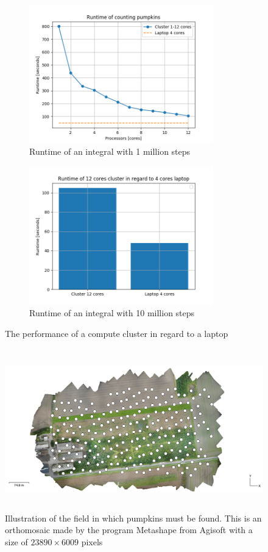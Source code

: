 \documentclass[../Head/Report.tex]{subfiles}
\begin{document}
\begin{figure}[H]
\centering
  \begin{subfigure}[b]{0.48\textwidth}
  \centering
    \includegraphics[height=6cm]{../Figures/runtime_counting_pumpkins1.png}
    \caption{Runtime of an integral with 1 million steps}
    \label{fig:counting_pumpkins_plot}
  \end{subfigure}
  \hfill
  \begin{subfigure}[b]{0.48\textwidth}
  \centering
    \includegraphics[height=6cm]{../Figures/barchart_pumpkin_runtime.png}
    \caption{Runtime of an integral with 10 million steps}
    \label{fig:counting_pumpkins_barchart}
  \end{subfigure}
  \caption{The performance of a compute cluster in regard to a laptop}
  \label{fig:counting_pumpkins}
\end{figure}  

\begin{figure}[H]
	\centering
	\captionsetup{justification=centering}
	\includegraphics[height=7cm]{../Figures/orthomosaic.png}
    \caption{Illustration of the field in which pumpkins must be found. This is an orthomosaic made by the program Metashape from Agisoft with a size of $23890 \times 6009$ pixels}
    \label{fig:orthomosaic}
\end{figure}
\end{document}
